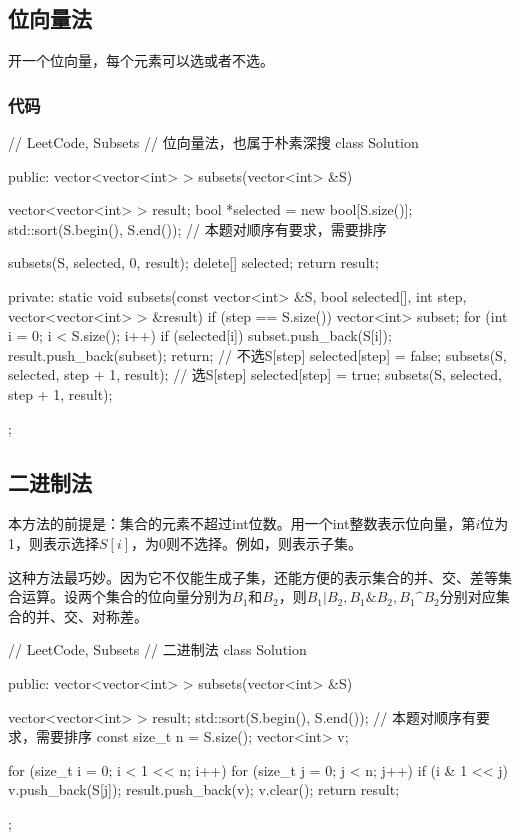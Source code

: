 \subsection{位向量法}
开一个位向量，每个元素可以选或者不选。


\subsubsection{代码}
\begin{Code}
// LeetCode, Subsets
// 位向量法，也属于朴素深搜
class Solution {
public:
    vector<vector<int> > subsets(vector<int> &S) {
        vector<vector<int> > result;
        bool *selected = new bool[S.size()];
        std::sort(S.begin(), S.end()); // 本题对顺序有要求，需要排序

        subsets(S, selected, 0, result);
        delete[] selected;
        return result;
    }

private:
    static void subsets(const vector<int> &S, bool selected[], int step, 
            vector<vector<int> > &result) {
        if (step == S.size()) {
            vector<int> subset;
            for (int i = 0; i < S.size(); i++) {
                if (selected[i]) subset.push_back(S[i]);
            }
            result.push_back(subset);
            return;
        }
        // 不选S[step]
        selected[step] = false;
        subsets(S, selected, step + 1, result);
        // 选S[step]
        selected[step] = true;
        subsets(S, selected, step + 1, result);
    }
};
\end{Code}


\subsection{二进制法}
本方法的前提是：集合的元素不超过int位数。用一个int整数表示位向量，第$i$位为1，则表示选择$S[i]$，为0则不选择。例如，则表示子集。

这种方法最巧妙。因为它不仅能生成子集，还能方便的表示集合的并、交、差等集合运算。设两个集合的位向量分别为$B_1$和$B_2$，则$B_1|B_2, B_1 \& B_2, B_1 \^ B_2$分别对应集合的并、交、对称差。

\begin{Code}
// LeetCode, Subsets
// 二进制法
class Solution {
public:
    vector<vector<int> > subsets(vector<int> &S) {
        vector<vector<int> > result;
        std::sort(S.begin(), S.end()); // 本题对顺序有要求，需要排序
        const size_t n = S.size();
        vector<int> v;

        for (size_t i = 0; i < 1 << n; i++) {
            for (size_t j = 0; j < n; j++) {
                if (i & 1 << j) v.push_back(S[j]);
            }
            result.push_back(v);
            v.clear();
        }
        return result;
    }
};
\end{Code}


